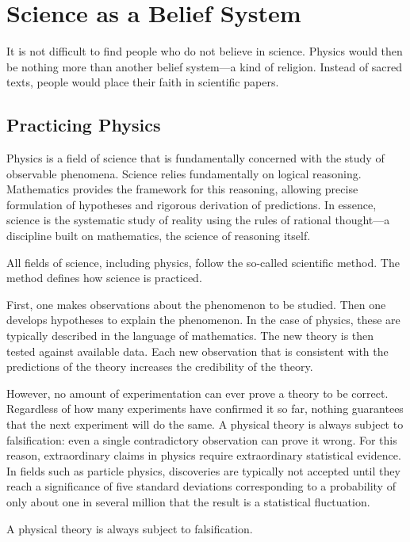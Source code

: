\chapter{Science as a Belief System}

It is not difficult to find people who do not believe in science.
Physics would then be nothing more than another belief system—a kind of religion.
Instead of sacred texts, people would place their faith in scientific papers.


\section{Practicing Physics}

Physics is a field of science that is fundamentally concerned with the study of observable phenomena.
Science relies fundamentally on logical reasoning. Mathematics provides the framework for this reasoning, allowing precise formulation of hypotheses and rigorous derivation of predictions.
In essence, science is the systematic study of reality using the rules of rational thought—a discipline built on mathematics, the science of reasoning itself.

All fields of science, including physics, follow the so-called
scientific method. The method defines how science is practiced.

First, one makes observations about the phenomenon
to be studied. Then one develops hypotheses to explain the phenomenon. In
the case of physics, these are typically described in the language of
mathematics. The new theory is then tested against available
data. Each new observation that is consistent with the predictions
of the theory increases the credibility of the theory.

However, no amount of experimentation can ever prove a theory to be correct.
Regardless of how many experiments have confirmed it so far, nothing guarantees that the next experiment will do the same.
A physical theory is always subject to falsification: even a single contradictory observation can prove it wrong.
For this reason, extraordinary claims in physics require extraordinary statistical evidence.
In fields such as particle physics, discoveries are typically not accepted until they reach a significance of five standard deviations
corresponding to a probability of only about one in several million that the result is a statistical fluctuation.

A physical theory is always subject to falsification.

